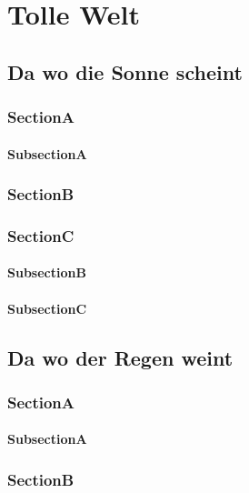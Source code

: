 \documentclass[ElegantBook]{Lilly}
\begin{document}

\TableOfContents

\part{Tolle Welt}


\chapter{Da wo die Sonne scheint}
  \printMiniToc


\section{SectionA}
  \lipsum[1-2]
\subsection{SubsectionA}
  \lipsum[2-4]
  \clearpage
\section{SectionB}
  \lipsum[6-8]
\section{SectionC}
  \lipsum[1-2]
\subsection{SubsectionB}
  \lipsum[1]
\subsection{SubsectionC}
  \lipsum[2]

\chapter{Da wo der Regen weint}
  \printMiniToc

\section{SectionA}
  \lipsum[1-2]
\subsection{SubsectionA}
  \lipsum[2-4]
\section{SectionB}
  \lipsum[6-8]
\end{document}
